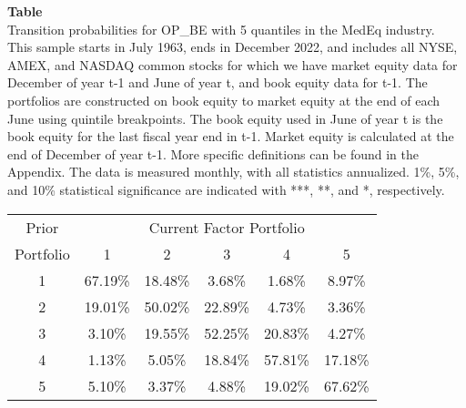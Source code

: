 \begin{table*}[ht!]
\raggedright
{}
\label{tab: transition_probs_OP_BE_MedEq_with_5_quantiles}
\textbf{Table \thetable} \\
Transition probabilities for OP_BE with 5 quantiles in the MedEq industry. \\
\hspace*{1em}This sample starts in July 1963, ends in December 2022, and includes all NYSE, AMEX, and NASDAQ common stocks for which we have market equity data for December of year t-1 and June of year t, and book equity data for t-1. The portfolios are constructed on book equity to market equity at the end of each June using quintile breakpoints.  The book equity used in June of year t is the book equity for the last fiscal year end in t-1.  Market equity is calculated at the end of December of year t-1.  More specific definitions can be found in the Appendix.  The data is measured monthly, with all statistics annualized.  1\%, 5\%, and 10\% statistical significance are indicated with ***, **, and *, respectively. \\
\vspace{0.5em}
\centering
\begin{adjustbox}{max width=\textwidth}
\begin{tabular}{@{}cccccc@{}}
\toprule
Prior & \multicolumn{5}{c}{Current Factor Portfolio} \\
Portfolio & 1 & 2 & 3 & 4 & 5 \\
\midrule
1 & 67.19\% & 18.48\% & 3.68\% & 1.68\% & 8.97\% \\
2 & 19.01\% & 50.02\% & 22.89\% & 4.73\% & 3.36\% \\
3 & 3.10\% & 19.55\% & 52.25\% & 20.83\% & 4.27\% \\
4 & 1.13\% & 5.05\% & 18.84\% & 57.81\% & 17.18\% \\
5 & 5.10\% & 3.37\% & 4.88\% & 19.02\% & 67.62\% \\
\bottomrule
\end{tabular}
\end{adjustbox}
\end{table*}